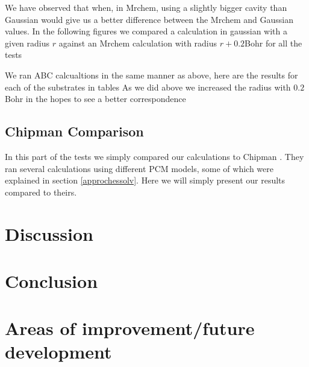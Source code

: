\documentclass[../master_thesis.tex]{subfiles}
\begin{document}
We have observed that when, in Mrchem,  using a slightly bigger cavity than
Gaussian would give us a better difference between the Mrchem and Gaussian values.
In the following figures %
we compared a calculation in gaussian with a given radius $r$
against an Mrchem calculation with radius $r + 0.2$Bohr for all the tests



We ran \ac{ABC} calcualtions in the same manner as above, here are the results for
each of the substrates in tables %
As we did above we increased the radius with $0.2$ Bohr in the hopes to see a
better correspondence


\subsection{Chipman Comparison}
In this part of the tests we simply compared our calculations to Chipman \cite{Chipman2002}.
They ran several calculations using different \ac{PCM} models, some of which were
explained in section \ref{approchessolv}. Here we will simply present our results
compared to theirs.


\section{Discussion}
\section{Conclusion}
\section{Areas of improvement/future development}
\end{document}
